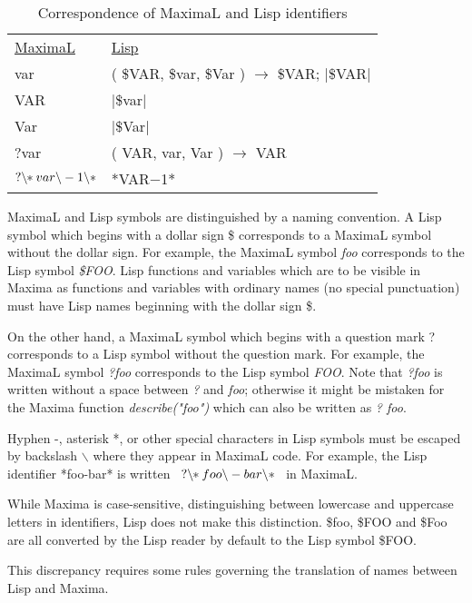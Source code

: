\documentclass[../Maxima_Workbook.tex]{subfiles}
\begin{document}
\begin{table}[h!]
\begin{tabular}{l l}
	\underline{MaximaL} & \underline{Lisp} \\
	var & \big( \$VAR, \en \$var, \en \$Var \big) $ \rightarrow $ \$VAR; \quad |\$VAR| \\
	VAR & |\$var| \\
	Var & |\$Var| \\
	?var & \big( VAR, \en var, \en Var \big) $ \rightarrow $ VAR \\
	$ ? \backslash \hspace{-1mm} *var \backslash - 1 \backslash* $ & *VAR$ - $1*
\end{tabular}
\caption{Correspondence of MaximaL and Lisp identifiers}\label{Tab-B1}
\end{table}

MaximaL and Lisp symbols are distinguished by a naming convention. A Lisp symbol which begins with a dollar sign \$ corresponds to a MaximaL symbol without the dollar sign. For example, the MaximaL symbol \emph{foo} corresponds to the Lisp symbol \emph{\$FOO}. Lisp functions and variables which are to be visible in Maxima as functions and variables with ordinary names (no special punctuation) must have Lisp names beginning with the dollar sign \$.

\lz On the other hand, a MaximaL symbol which begins with a question mark ? corresponds to a Lisp symbol without the question mark. For example, the  MaximaL symbol \emph{?foo} corresponds to the Lisp symbol \emph{FOO}. Note that \emph{?foo} is written without a space between \emph{?} and \emph{foo}; otherwise it might be mistaken for the Maxima function \emph{describe("foo")} which can also be written as \emph{? foo}.

\lz Hyphen -, asterisk *, or other special characters in Lisp symbols must be escaped by backslash $ \backslash $ where they appear in MaximaL code. For example, the Lisp identifier *foo-bar* is written $ \enskip ? \backslash \hspace{-1mm} *foo \backslash -bar \backslash * \enskip $ in MaximaL. 

\lz While Maxima is case-sensitive, distinguishing between lowercase and uppercase letters in identifiers, Lisp does not make this distinction. \$foo, \$FOO and \$Foo are all converted by the Lisp reader by default to the Lisp symbol \$FOO.

This discrepancy requires some rules governing the translation of names between Lisp and Maxima.
\end{document}
